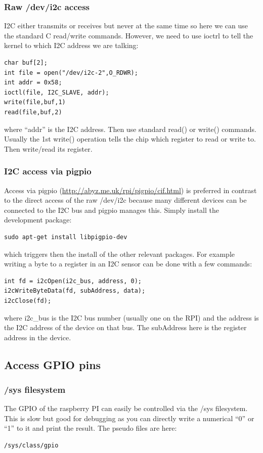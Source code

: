\documentclass[12pt]{report}
\begin{document}
\subsubsection{Raw /dev/i2c access}
I2C either transmits or receives but never at the same time so here we
can use the standard C read/write commands. However, we need to use ioctrl to tell
the kernel to which I2C address we are talking:
\begin{verbatim}
char buf[2];
int file = open("/dev/i2c-2",O_RDWR);
int addr = 0x58;
ioctl(file, I2C_SLAVE, addr);
write(file,buf,1)
read(file,buf,2)
\end{verbatim}
where ``addr'' is the I2C address. Then use standard read()
or write() commands. Usually the 1st write() operation tells the chip
which register to read or write to. Then write/read its register.

\subsubsection{I2C access via pigpio}
Access via pigpio (\url{http://abyz.me.uk/rpi/pigpio/cif.html})
is preferred in contrast to the direct
access of the raw /dev/i2c because many different devices
can be connected to the I2C bus and pigpio manages this.
Simply install the development package:
\begin{verbatim}
sudo apt-get install libpigpio-dev
\end{verbatim}
which triggers then the install of the other relevant packages.
For example writing a byte to a register in an I2C sensor can be done with a
few commands:
\begin{verbatim}
int fd = i2cOpen(i2c_bus, address, 0);
i2cWriteByteData(fd, subAddress, data);
i2cClose(fd);
\end{verbatim}
where i2c\_bus is the I2C bus number (usually one on the RPI)
and the address is the I2C address of the device on that bus.
The subAddress here is the register address in the device.

\subsection{Access GPIO pins}
\subsubsection{/sys filesystem}
The GPIO of the raspberry PI can easily be controlled via
the /sys filesystem. This is slow but good for
debugging as you can directly write a numerical
``0'' or ``1'' to it and print the result. The
pseudo files are here:
\begin{verbatim}
/sys/class/gpio
\end{verbatim}
\end{document}
